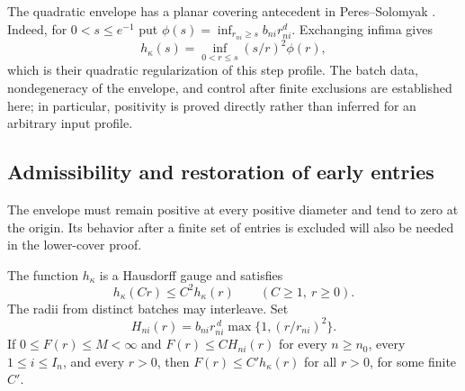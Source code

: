 The quadratic envelope has a planar covering antecedent in
Peres--Solomyak \cite[Lemma~1.2 and Section~5]{PeresSolomyak2005}.
Indeed, for $0<s\le e^{-1}$ put
$\phi(s)=\inf_{r_{ni}\ge s}b_{ni}r_{ni}^{d}$. Exchanging infima gives
\[
 h_\kappa(s)=\inf_{0<r\le s}(s/r)^2\phi(r),
\]
which is their quadratic regularization of this step profile.
The batch data, nondegeneracy of the envelope, and control after finite
exclusions are established here; in particular, positivity is proved
directly rather than inferred for an arbitrary input profile.

\subsection{Admissibility and restoration of early entries}

The envelope must remain positive at every positive diameter and tend
to zero at the origin. Its behavior after a finite set of entries is
excluded will also be needed in the lower-cover proof.

\begin{proposition}\label{gauge:admissible}
The function \(h_\kappa\) is a Hausdorff gauge and satisfies
\begin{equation}\label{gauge:doubling}
h_\kappa(Cr)\le C^2h_\kappa(r)
\qquad(C\ge1,\ r\ge0).
\end{equation}
The radii from distinct batches may interleave. Set
\[
H_{ni}(r)=b_{ni}r_{ni}^{\,d}\max\{1,(r/r_{ni})^2\}.
\]
If \(0\le F(r)\le M<\infty\) and
\(F(r)\le C H_{ni}(r)\) for every \(n\ge n_0\), every
\(1\le i\le I_n\), and every \(r>0\), then
\(F(r)\le C' h_\kappa(r)\) for all \(r>0\), for some finite
\(C'\).
\end{proposition}

